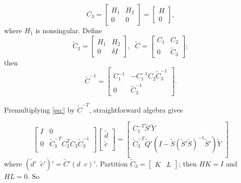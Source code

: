 \documentclass[12pt]{article}
\newcommand{\tildeS}{\tilde{S}}
\newcommand{\tildeY}{\tilde{Y}}
\newcommand{\tildeQ}{\tilde{Q}}
\theoremstyle{definition}
\begin{document}
\begin{equation*}
C_3 = \begin{bmatrix} H_1 & H_2 \\ 0 & 0 \end{bmatrix} = \begin{bmatrix} H \\  0 \end{bmatrix},
\end{equation*}
\noindent
where $H_1$ is nonsingular. Define
\begin{equation} \label{eq:cholesky-factor-mod}
\tilde{C}_3 = \begin{bmatrix}
H_1 & H_2 \\
0  & \delta I 
\end{bmatrix}, \;\;
\tilde{C} = \begin{bmatrix}
C_1 & C_2 \\
0  & \tilde{C}_3 
\end{bmatrix};
\end{equation}
\noindent
then
\begin{equation} \label{eq:cholesky-factor-mod-inverse}
\tilde{C}^{-1} = \begin{bmatrix}
C_1^{-1} & -C_1^{-1} C_2 \tilde{C}_3^{-1} \\
0  & \tilde{C}_3^{-1}
\end{bmatrix}.
\end{equation}

Premultiplying \ref{eq:} by $\tilde{C}^{-T}$, straightforward algebra gives 

\begin{equation} \label{eq:vectorized-normal-equations-cholesky}
\begin{bmatrix}
I & 0 \\
0 & \tilde{C}_3^{-T} C_3^{T} C_3 \tilde{C}_3^{-1}\\
\end{bmatrix}
\begin{bmatrix}
\tilde{d}\\
\tilde{c}\\
\end{bmatrix}
= \begin{bmatrix}
C_1^{-T} \tildeS'\tildeY \\
\tilde{C}_3^{-T} \tildeQ'\left( I - \tildeS\left( \tildeS' \tildeS \right)^{-1} \tildeS' \right) \tildeY\\
\end{bmatrix}
\end{equation}
\noindent
where $\left( \tilde{d}'\;\;\tilde{c}' \right)' =  \tilde{C}' \left( d\;\;c \right)'$. Partition $\tilde{C}_3 = \begin{bmatrix} K &  L\end{bmatrix}$; then $HK = I$ and $HL = 0$. So
\end{document}
